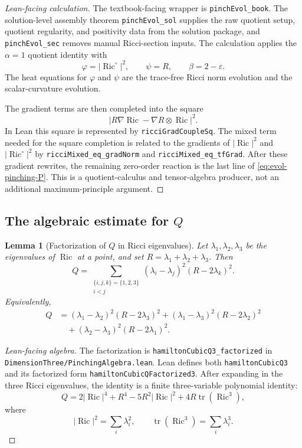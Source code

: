\documentclass[11pt]{article}
\theoremstyle{plain}
\newtheorem{lemma}[theorem]{Lemma}
\theoremstyle{definition}
\theoremstyle{remark}
\newcommand{\Ric}{\operatorname{Ric}}
\newcommand{\tr}{\operatorname{tr}}
\newcommand{\norm}[1]{\left|#1\right|}
\newcommand{\eps}{\varepsilon}
\newcommand{\leanref}[1]{\nolinkurl{#1}}
\newcommand{\leanfile}[1]{\nolinkurl{#1}}
\newcommand{\rffile}[1]{\leanfile{#1}}
\begin{document}
\begin{proof}[Lean-facing calculation]
The textbook-facing wrapper is \leanref{pinchEvol_book}.  The solution-level
assembly theorem \leanref{pinchEvol_sol} supplies the raw quotient setup,
quotient regularity, and positivity data from the solution package, and
\leanref{pinchEvol_sec} removes manual Ricci-section inputs.  The calculation
applies the \(\alpha=1\) quotient identity with
\[
  \varphi=\norm{\Ric^\circ}^2,
  \qquad
  \psi=R,
  \qquad
  \beta=2-\eps.
\]
The heat equations for \(\varphi\) and \(\psi\) are the trace-free Ricci norm
evolution and the scalar-curvature evolution.

The gradient terms are then completed into the square
\[
  \norm{R\nabla\Ric-\nabla R\otimes\Ric}^2.
\]
In Lean this square is represented by \leanref{ricciGradCoupleSq}.  The mixed
term needed for the square completion is related to the gradients of
\(\norm{\Ric}^2\) and \(\norm{\Ric^\circ}^2\) by
\leanref{ricciMixed_eq_gradNorm} and \leanref{ricciMixed_eq_tfGrad}.  After
these gradient rewrites, the remaining zero-order reaction is the last line of
\eqref{eq:evol-pinching-P}.  This is a quotient-calculus and tensor-algebra
producer, not an additional maximum-principle argument.
\end{proof}

\subsection{The algebraic estimate for \texorpdfstring{$Q$}{Q}}

\begin{lemma}[Factorization of \texorpdfstring{$Q$}{Q} in Ricci eigenvalues]
\label{lem:Q-factorization}
Let $\lambda_1,\lambda_2,\lambda_3$ be the eigenvalues of $\Ric$ at a point,
and set $R=\lambda_1+\lambda_2+\lambda_3$. Then
\[
Q
=
\sum_{\substack{\{i,j,k\}=\{1,2,3\}\\ i<j}}
(\lambda_i-\lambda_j)^2(R-2\lambda_k)^2.
\]
Equivalently,
\begin{align*}
Q
&=
(\lambda_1-\lambda_2)^2(R-2\lambda_3)^2
+(\lambda_1-\lambda_3)^2(R-2\lambda_2)^2
\\
&\quad
+(\lambda_2-\lambda_3)^2(R-2\lambda_1)^2.
\end{align*}
\end{lemma}

\begin{proof}[Lean-facing algebra]
The factorization is \leanref{hamiltonCubicQ3_factorized} in
\rffile{DimensionThree/PinchingAlgebra.lean}.  Lean defines both
\leanref{hamiltonCubicQ3} and its factorized form
\leanref{hamiltonCubicQFactorized3}.  After expanding in the three Ricci
eigenvalues, the identity is a finite three-variable polynomial identity:
\[
Q=2\norm{\Ric}^4+R^4-5R^2\norm{\Ric}^2+4R\tr(\Ric^3),
\]
where
\[
\norm{\Ric}^2=\sum_i\lambda_i^2,
\qquad
\tr(\Ric^3)=\sum_i\lambda_i^3.
\]
\end{proof}
\end{document}
